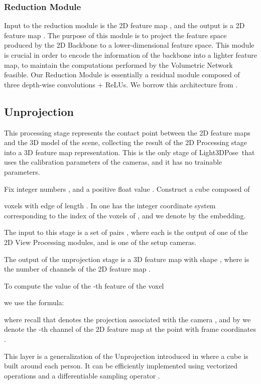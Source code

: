 \documentclass[a4paper,conference]{IEEEtran}
\newcommand{\thename}{Light3DPose}
\begin{document}
\subsubsection{Reduction Module} 

Input to the reduction module is the 2D feature map , and
the output is a 2D feature map .
The purpose of this module is to project the feature space produced 
by the 2D Backbone to a lower-dimensional feature 
space. This module is crucial in order to encode the information
of the backbone into a lighter feature map, to maintain the computations
performed by the Volumetric Network feasible. 
Our Reduction Module is essentially a residual module composed of three 
depth-wise convolutions + ReLUs.
We borrow this 
architecture from \cite{osokin2018lightweight_openpose}.

\subsection{Unprojection}

This processing stage represents the contact point between the 2D feature 
maps and the 3D model of the scene, collecting the result of the 
2D Processing stage into a 3D feature map representation.
This is the only stage of \thename\ 
that uses the calibration parameters of the cameras, and it has no
trainable parameters.

Fix integer numbers , and a positive float value .
Construct a cube  composed of 

voxels with edge of length . In  one has the integer 
coordinate system  corresponding to the index of the voxels
of , and we denote by 
the embedding.

The input to this stage is a set of pairs
, where each 
is the output
of one of the 2D View Processing modules, and  is one of the
setup cameras.

The output of the unprojection stage is a 3D feature map  
with shape , where
 is the number of channels of the 2D feature map .

To compute the value of the -th feature of the voxel 

we use the formula:

where recall that  denotes the projection associated with
the camera , and by  we denote the -th channel
of the 2D feature map  at the point with frame coordinates .

This layer is a generalization of the Unprojection introduced in
\cite{iskakov2019learnable} where a cube is built around each person.
It can be efficiently implemented using 
vectorized operations and a differentiable sampling operator \cite{jaderberg2015spatial}.
\end{document}
